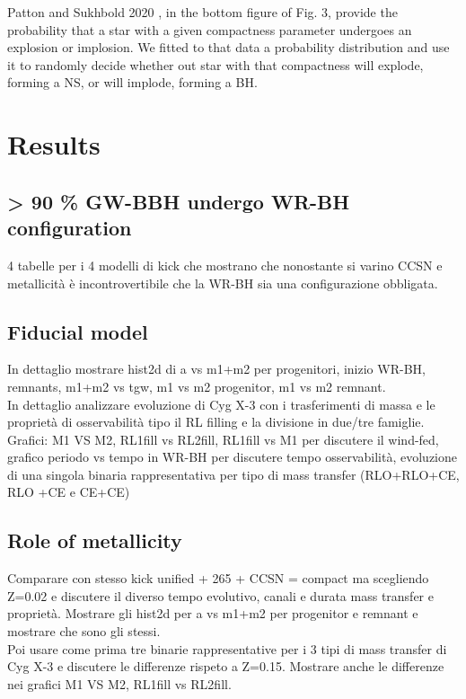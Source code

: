 \documentclass[a4paper,titlepage]{book}     	%
\begin{document}
Patton and Sukhbold 2020 \cite{COcollapse}, in the bottom figure of Fig. 3, provide the probability that a star with a given compactness parameter undergoes an explosion or implosion. We fitted to that data a probability distribution and use it to randomly decide whether out star with that compactness will explode, forming a NS, or will implode, forming a BH.\\




\chapter{Results}\label{sec:results}
\section{> 90 \% GW-BBH undergo WR-BH configuration}
4 tabelle per i 4 modelli di kick che mostrano che nonostante si varino CCSN e metallicità è incontrovertibile che la WR-BH sia una configurazione obbligata.

\section{Fiducial model}
In dettaglio mostrare hist2d di a vs m1+m2 per progenitori, inizio WR-BH, remnants, m1+m2 vs tgw, m1 vs m2 progenitor, m1 vs m2 remnant.\\
In dettaglio analizzare evoluzione di Cyg X-3 con i trasferimenti di massa e le proprietà di osservabilità tipo il RL filling e la divisione in due/tre famiglie. Grafici: M1 VS M2, RL1fill vs RL2fill, RL1fill vs M1 per discutere il wind-fed, grafico periodo vs tempo in WR-BH per discutere tempo osservabilità, evoluzione di una singola binaria rappresentativa per tipo di mass transfer (RLO+RLO+CE, RLO +CE e CE+CE)

\section{Role of metallicity}
Comparare con stesso kick unified + 265 + CCSN = compact ma scegliendo Z=0.02 e discutere il diverso tempo evolutivo, canali e durata mass transfer e proprietà.
Mostrare gli hist2d per a vs m1+m2 per progenitor e remnant e mostrare che sono gli stessi.\\
Poi usare come prima tre binarie rappresentative per i 3 tipi di mass transfer di Cyg X-3 e discutere le differenze rispeto a Z=0.15. Mostrare anche le differenze nei grafici M1 VS M2, RL1fill vs RL2fill.
\end{document}
